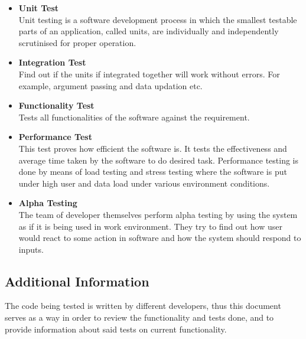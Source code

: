 \documentclass[12pt]{article}
\begin{document}
{			\begin{itemize}

				\item \textbf{Unit Test}\\
				\newline
				Unit testing is a software development process in which the smallest testable parts of an application, called units, are individually and independently scrutinised for proper operation.\\
				\item \textbf{Integration Test}\\
				\newline 
				Find out if the units if integrated together will work without errors. For example, argument passing and data updation etc.
				\item \textbf{Functionality Test}\\
				\newline 
				Tests all functionalities of the software against the requirement.
				\item \textbf{Performance Test}\\
				\newline 
				This test proves how efficient the software is. It tests the effectiveness and average time taken by the software to do desired task. Performance testing is done by means of load testing and stress testing where the software is put under high user and data load under various environment conditions.
				\item \textbf{Alpha Testing}\\
				\newline 
				The team of developer themselves perform alpha testing by using the system as if it is being used in work environment. They try to find out how user would react to some action in software and how the system should respond to inputs.

			\end{itemize}

		\subsection{Additional Information}

		The code being tested is written by different developers, thus this document serves as a way in order to review the functionality and tests done, and to provide information about said tests on current functionality.\\\\


}
\end{document}
